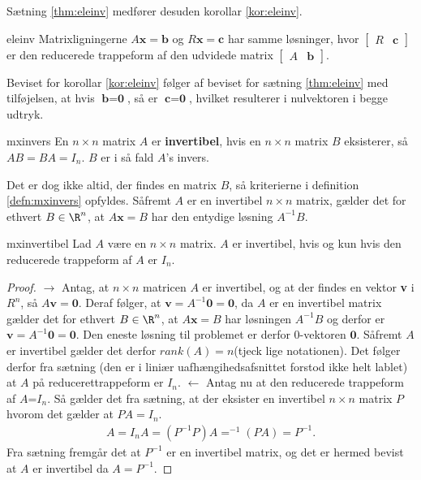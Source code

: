 %
\noindent
Sætning \ref{thm:eleinv} medfører desuden korollar \ref{kor:eleinv}.
\begin{kor}{}{eleinv}
Matrixligningerne $A\textbf{x}=\textbf{b}$ og $R\textbf{x}=\textbf{c}$ har samme løsninger, hvor 
$
\begin{bmatrix}
R & \textbf{c}
\end{bmatrix}
$
er den reducerede trappeform af den udvidede matrix 
$
\begin{bmatrix}
A & \textbf{b}
\end{bmatrix}
$.
\end{kor}
Beviset for korollar \ref{kor:eleinv} følger af beviset for sætning \ref{thm:eleinv} med tilføjelsen, at hvis $\textbf{b}=\textbf{0}$, så er $\textbf{c}=\textbf{0}$, hvilket resulterer i nulvektoren i begge udtryk. 
%
%
\begin{defn}{}{mxinvers}
En $n \times n$ matrix $A$ er \textbf{invertibel}, hvis en $n \times n$ matrix $B$ eksisterer, så $AB=BA=I_n$. $B$ er i så fald $A$'s invers. 
\end{defn}
Det er dog ikke altid, der findes en matrix $B$, så kriterierne i definition \ref{defn:mxinvers} opfyldes. 
Såfremt $A$ er en invertibel $n \times n$ matrix, gælder det for ethvert $B \in \R^n$, at $A\textbf{x}=B$ har den entydige løsning $A^{-1}B$.
%
\begin{thm}{}{mxinvertibel}
Lad $A$ være en $n \times n$ matrix. 
$A$ er invertibel, hvis og kun hvis den reducerede trappeform af $A$ er $I_n$.
\end{thm}
%
\begin{proof}
$\rightarrow$ Antag, at $n\times n$ matricen $A$ er invertibel, og at der findes en vektor \textbf{v} i $R^n$, så $A\textbf{v}=\textbf{0}$. 
Deraf følger, at $\textbf{v}=A^{-1}\textbf{0}=\textbf{0}$, da $A$ er en invertibel matrix gælder det for ethvert $B \in \R^n$, at $A\textbf{x}=B$ har løsningen $A^{-1}B$ og derfor er $\textbf{v}=A^{-1}\textbf{0}=\textbf{0}$. 
Den eneste løsning til problemet er derfor $0$-vektoren $\textbf{0}$. 
Såfremt $A$ er invertibel gælder det derfor $rank(A)=n$(tjeck lige notationen).
Det følger derfor fra sætning (den er i liniær uafhængihedsafsnittet forstod ikke helt lablet) at $A$ på reducerettrappeform er $I_n$.
$\leftarrow$
Antag nu at den reducerede trappeform af $A$=$I_n$. 
Så gælder det fra sætning, at der eksister en invertibel $n \times n$ matrix $P$ hvorom det gælder at $PA=I_n$. 
%
\begin{align*}
A=I_nA=(P^{-1}P)A=^{-1}(PA)=P^{-1}.
\end{align*}
%
Fra sætning fremgår det at $P^{-1}$ er en invertibel matrix, og det er hermed bevist at $A$ er invertibel da $A=P^{-1}$.
\end{proof}
